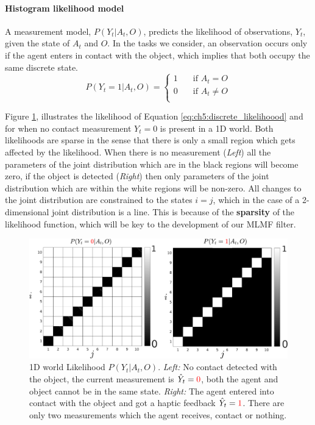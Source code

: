 \paragraph{Histogram likelihood model}

A measurement model, $P(Y_t|A_t,O)$, predicts the likelihood of observations, $Y_t$, given the state of $A_t$ and $O$. 
In the tasks we consider, an observation occurs only if the agent enters in contact with the object, which implies that both
occupy the same discrete state. 
\begin{equation} \label{eq:ch5:discrete_likelihoood}
P(Y_t=1|A_t,O) =
  \begin{cases}
    1       & \quad \text{if } A_t = O     \\
    0  	    & \quad \text{if } A_t \not= O \\
  \end{cases}
\end{equation}

Figure \ref{fig:histogram_likelihood}, illustrates the likelihood of Equation \ref{eq:ch5:discrete_likelihoood} and for when
no contact measurement $Y_t=0$ is present in a 1D world. Both likelihoods are sparse in the sense that there is only a small 
region which gets affected by the likelihood. When there is no measurement (\textit{Left}) all the parameters of the 
joint distribution which are in the black regions will become zero, if the object is detected (\textit{Right}) then 
only parameters of the joint distribution which are within the white regions will be non-zero. All changes
to the joint distribution are constrained to the states $i = j$, which in the case of a 2-dimensional joint 
distribution is a line. This is because of the \textbf{sparsity} of the likelihood function, which will be key to 
the development of our MLMF filter.

\begin{figure}
 \centering
 \includegraphics[width=\textwidth]{./ch5-MLMF/Figures/explenation/hist_likelihood.pdf}
 \caption{1D world Likelihood $P(Y_t|A_t,O)$. \textit{Left:} No contact detected with the object, the current measurement 
 is $\hat{Y}_t = \textcolor{red}0$, both the agent and object cannot be in the same state. \textit{Right:} The agent 
 entered into contact with the object and got a haptic feedback $\hat{Y}_t = \textcolor{red}1$. There are only two measurements 
 which the agent receives, contact or nothing.}
 \label{fig:histogram_likelihood}
\end{figure}

